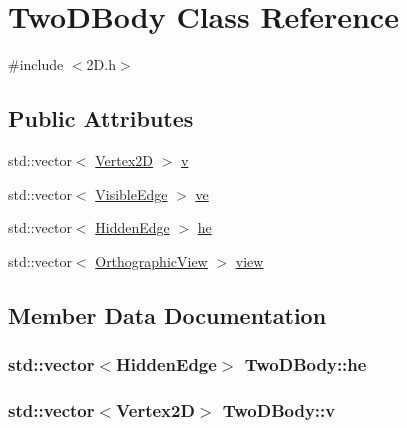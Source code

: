 \hypertarget{class_two_d_body}{}\section{Two\+D\+Body Class Reference}
\label{class_two_d_body}


{\ttfamily \#include $<$2\+D.\+h$>$}

\subsection*{Public Attributes}
\begin{DoxyCompactItemize}
\item 
std\+::vector$<$ \hyperlink{class_vertex2_d}{Vertex2D} $>$ \hyperlink{class_two_d_body_a28003130b9cd049b6ab0c750af18a7a0}{v}
\item 
std\+::vector$<$ \hyperlink{class_visible_edge}{Visible\+Edge} $>$ \hyperlink{class_two_d_body_ac7b38febf4667a16f07ff25b35bd818d}{ve}
\item 
std\+::vector$<$ \hyperlink{class_hidden_edge}{Hidden\+Edge} $>$ \hyperlink{class_two_d_body_a4123a65d4e19ad38a33bca38f121d4be}{he}
\item 
std\+::vector$<$ \hyperlink{class_orthographic_view}{Orthographic\+View} $>$ \hyperlink{class_two_d_body_ab3fca58e4b377854805f3149c5e1a96e}{view}
\end{DoxyCompactItemize}


\subsection{Member Data Documentation}
\subsubsection[{\texorpdfstring{he}{he}}]{\setlength{\rightskip}{0pt plus 5cm}std\+::vector$<${\bf Hidden\+Edge}$>$ Two\+D\+Body\+::he}\hypertarget{class_two_d_body_a4123a65d4e19ad38a33bca38f121d4be}{}\label{class_two_d_body_a4123a65d4e19ad38a33bca38f121d4be}
\subsubsection[{\texorpdfstring{v}{v}}]{\setlength{\rightskip}{0pt plus 5cm}std\+::vector$<${\bf Vertex2D}$>$ Two\+D\+Body\+::v}\hypertarget{class_two_d_body_a28003130b9cd049b6ab0c750af18a7a0}{}\label{class_two_d_body_a28003130b9cd049b6ab0c750af18a7a0}
